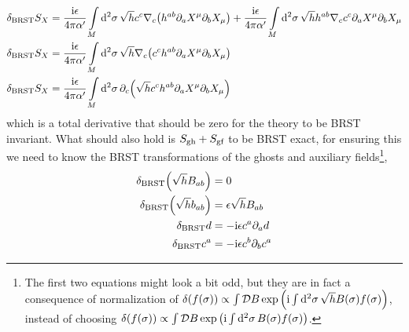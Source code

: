 \begin{align*}
    \delta_{\textnormal{BRST}}S_X&=\frac{\textnormal{i}\epsilon}{4\pi\alpha'}\int\limits_{M}\dd[2]{\sigma}\sqrt{h}c^c\nabla_c\qty(h^{ab}\partial_aX^\mu \partial_bX_\mu)+\frac{\textnormal{i}\epsilon}{4\pi\alpha'}\int\limits_{M}\dd[2]{\sigma}\sqrt{h}h^{ab}\nabla_cc^c\partial_aX^\mu\partial_b X_\mu\\
    \delta_{\textnormal{BRST}}S_X&=\frac{\textnormal{i}\epsilon}{4\pi\alpha'}\int\limits_{M}\dd[2]{\sigma}\sqrt{h}\nabla_c\qty(c^c h^{ab}\partial_aX^\mu \partial_bX_\mu)\\
    \delta_{\textnormal{BRST}}S_X&=\frac{\textnormal{i}\epsilon}{4\pi\alpha'}\int\limits_{M}\dd[2]{\sigma}\partial_c\qty(\sqrt{h}c^c h^{ab}\partial_aX^\mu \partial_bX_\mu)
\end{align*}
which is a total derivative that should be zero for the theory to be BRST invariant. What should also hold is $S_{\textnormal{gh}}+S_{\textnormal{gf}}$ 
to be BRST exact, for ensuring this we need to know the BRST transformations of the ghosts and auxiliary fields\footnote{The first two equations might look a bit odd, but they are in fact a consequence of 
normalization of $\delta\qty(f\qty(\sigma))\propto\int\mathcal D B\exp\qty(\textnormal{i}\int\dd[2]{\sigma}\sqrt{h}B\qty(\sigma)f\qty(\sigma))$, instead of choosing $\delta\qty(f\qty(\sigma))\propto\int\mathcal D B\exp\qty(\textnormal{i}\int\dd[2]{\sigma}B\qty(\sigma)f\qty(\sigma))$.},
\begin{align*}
    \delta_{\textnormal{BRST}}\qty(\sqrt{h}B_{ab})&=0\\
    \delta_{\textnormal{BRST}}\qty(\sqrt{h}b_{ab})&=\epsilon\sqrt{h} B_{ab}\\
    \delta_{\textnormal{BRST}} d&=-\textnormal{i}\epsilon c^a\partial_a d\\
    \delta_{\textnormal{BRST}} c^a&=-\textnormal{i}\epsilon c^b\partial_b c^a
\end{align*}

